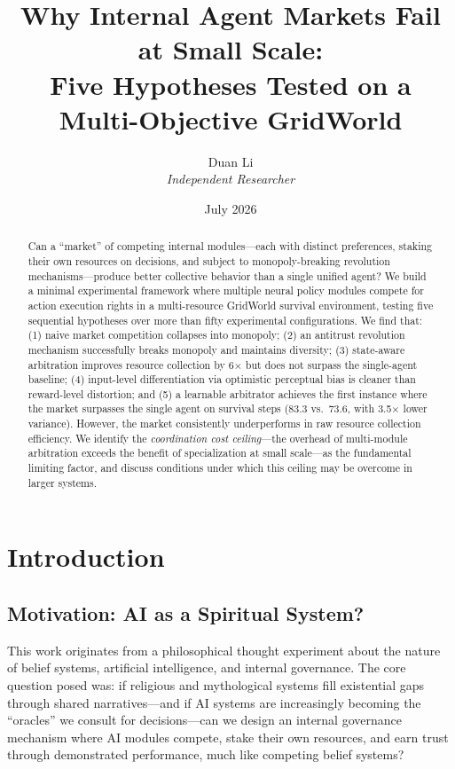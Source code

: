 \documentclass[a4paper,11pt]{article}
\title{\textbf{Why Internal Agent Markets Fail at Small Scale:\\
Five Hypotheses Tested on a Multi-Objective GridWorld}}
\author{Duan Li\\
\textit{Independent Researcher}}
\date{July 2026}
\begin{document}
\maketitle

\begin{abstract}
\noindent
Can a ``market'' of competing internal modules---each with distinct preferences, staking their own resources on decisions, and subject to monopoly-breaking revolution mechanisms---produce better collective behavior than a single unified agent? We build a minimal experimental framework where multiple neural policy modules compete for action execution rights in a multi-resource GridWorld survival environment, testing five sequential hypotheses over more than fifty experimental configurations. We find that: (1) naive market competition collapses into monopoly; (2) an antitrust revolution mechanism successfully breaks monopoly and maintains diversity; (3) state-aware arbitration improves resource collection by 6$\times$ but does not surpass the single-agent baseline; (4) input-level differentiation via optimistic perceptual bias is cleaner than reward-level distortion; and (5) a learnable arbitrator achieves the first instance where the market surpasses the single agent on survival steps (83.3 vs.\ 73.6, with 3.5$\times$ lower variance). However, the market consistently underperforms in raw resource collection efficiency. We identify the \textit{coordination cost ceiling}---the overhead of multi-module arbitration exceeds the benefit of specialization at small scale---as the fundamental limiting factor, and discuss conditions under which this ceiling may be overcome in larger systems.
\end{abstract}

\section{Introduction}

\subsection{Motivation: AI as a Spiritual System?}

This work originates from a philosophical thought experiment about the nature of belief systems, artificial intelligence, and internal governance. The core question posed was: if religious and mythological systems fill existential gaps through shared narratives---and if AI systems are increasingly becoming the ``oracles'' we consult for decisions---can we design an internal governance mechanism where AI modules compete, stake their own resources, and earn trust through demonstrated performance, much like competing belief systems?
\end{document}
